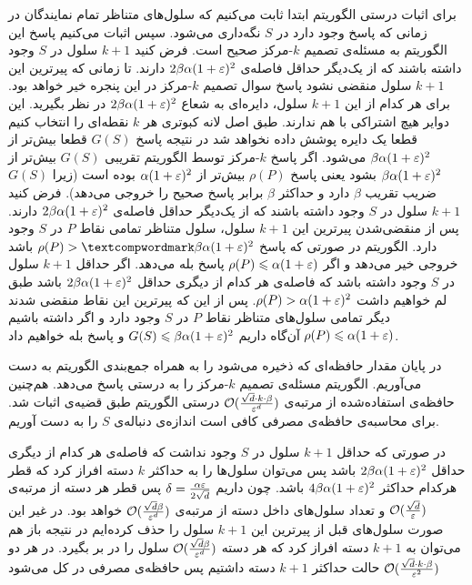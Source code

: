  برای اثبات درستی الگوریتم ابتدا ثابت می‌کنیم که سلول‌های متناظر تمام نمایندگان در زمانی که پاسخ وجود دارد در $S$ نگه‌داری می‌شود. سپس اثبات می‌کنیم پاسخ این الگوریتم به مسئله‌ی تصمیم $k$-مرکز صحیح است.
فرض کنید $k+1$ سلول در $S$ وجود داشته باشند که از یک‌دیگر حداقل فاصله‌ی $2\beta \alpha (1 + \varepsilon)^2$ دارند. تا زمانی که پیرترین این $k+1$ سلول منقضی نشود پاسخ سوال تصمیم $k$-مرکز در این پنجره خیر خواهد بود.
برای هر کدام از این $k+1$ سلول، دایره‌ای به شعاع $2\beta \alpha (1 + \varepsilon)^2$ در نظر بگیرید. این دوایر هیچ اشتراکی با هم ندارند. طبق اصل لانه کبوتری هر $k$ نقطه‌ای را انتخاب کنیم قطعا یک دایره پوشش داده نخواهد شد در نتیجه پاسخ $G(S)$ قطعا بیش‌تر از $\beta \alpha (1+\varepsilon)^2$ می‌شود. اگر پاسخ $k$-مرکز توسط الگوریتم تقریبی $G(S)$ بیش‌تر از $\beta \alpha (1+\varepsilon)^2$ بشود یعنی پاسخ $\rho(P)$ بیش‌تر از $\alpha (1+\varepsilon)^2$ بوده است (زیرا $G(S)$ ضریب تقریب $\beta$ دارد و حداکثر $\beta$ برابر پاسخ صحیح را خروجی می‌دهد).
فرض کنید $k+1$ سلول در $S$ وجود داشته باشند که از یک‌دیگر حداقل فاصله‌ی $2\beta \alpha (1 + \varepsilon)^2$ دارند. پس از منقضی‌شدن پیرترین این $k+1$ سلول، سلول متناظر تمامی نقاط $P$ در $S$ وجود دارد.
 الگوریتم  در صورتی که پاسخ 
 $\rho(P) > ‌\beta \alpha (1 + \eps)^2$ 
 باشد خروجی خیر می‌دهد و اگر 
  $\rho(P) \leqslant \alpha (1 + \varepsilon)$ 
  پاسخ بله می‌دهد.
  اگر حداقل $k+1$ سلول در $S$ وجود داشته باشد که فاصله‌ی هر کدام از دیگری حداقل $2\beta \alpha(1 + \varepsilon)^2$ باشد طبق لم  خواهیم داشت  $\rho(P) > \alpha (1 + \varepsilon)^2$. پس از این که پیرترین این نقاط منقضی شدند دیگر تمامی سلول‌های متناظر نقاط $P$ در $S$ وجود دارد و اگر داشته باشیم
    $\rho(P) \leqslant \alpha (1 + \varepsilon)$ 
    آن‌گاه داریم
   $ G(S) \leqslant \beta \alpha  (1+\varepsilon)^2$
   و پاسخ بله خواهیم داد.
 
در پایان مقدار حافظه‌ای که ذخیره می‌شود را به همراه جمع‌بندی الگوریتم  به دست می‌آوریم.
 الگوریتم  مسئله‌ی تصمیم $k$-مرکز را به درستی پاسخ می‌دهد. هم‌چنین حافظه‌ی استفاده‌شده از مرتبه‌ی 
$\mathcal{O}(\frac{\sqrt{d} \cdot k \cdot \beta}{\varepsilon^d})$
درستی الگوریتم طبق قضیه‌ی  اثبات شد. برای محاسبه‌ی حافظه‌ی مصرفی کافی است اندازه‌ی دنباله‌ی $S$ را به دست آوریم.

در صورتی که حداقل $k+1$ سلول در $S$ وجود نداشت که فاصله‌ی هر کدام از دیگری حداقل $2\beta \alpha(1 + \varepsilon)^2$ باشد پس می‌توان سلول‌ها را به حداکثر $k$ دسته افراز کرد که قطر هرکدام حداکثر $4\beta \alpha(1 + \varepsilon)^2$ باشد. چون داریم $\delta = \frac{\alpha \varepsilon}{2 \sqrt{d}}$ پس قطر هر دسته از مرتبه‌ی
 $\mathcal{O}(\frac{\sqrt{d}}{\varepsilon})$
 و تعداد سلول‌های داخل دسته از مرتبه‌ی
$\mathcal{O}(\frac{\sqrt{d} \beta}{\varepsilon^d})$
خواهد بود. در غیر این صورت سلول‌های قبل از پیرترین این $k+1$ سلول را حذف کرده‌ایم در نتیجه باز هم می‌توان به $k+1$ دسته افراز کرد که هر دسته 
$\mathcal{O}(\frac{\sqrt{d} \beta}{\varepsilon^d})$
سلول را در بر بگیرد. در هر دو حالت حداکثر $k+1$ دسته داشتیم پس حافظه‌ی مصرفی در کل می‌شود
$\mathcal{O}(\frac{\sqrt{d} \cdot k \cdot \beta}{\varepsilon^2})$

